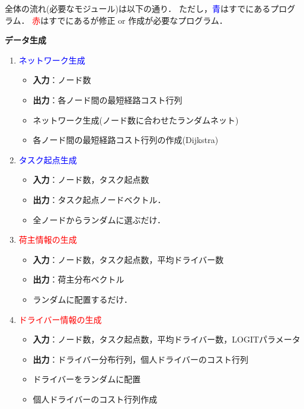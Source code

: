 \documentclass[a4paper,dvipdfmx]{ujarticle}
\begin{document}
    全体の流れ(必要なモジュール)は以下の通り．
    ただし，\textcolor{blue}{青}はすでにあるプログラム．
    \textcolor{red}{赤}はすでにあるが修正 or 作成が必要なプログラム．

    \textbf{データ生成}
    \begin{enumerate}
        \item \textcolor{blue}{ネットワーク生成}
            \begin{itemize}
                \item \textbf{入力}：ノード数
                \item \textbf{出力}：各ノード間の最短経路コスト行列
                \item ネットワーク生成(ノード数に合わせたランダムネット)
                \item 各ノード間の最短経路コスト行列の作成(Dijkstra)
            \end{itemize}

        \item \textcolor{blue}{タスク起点生成}
            \begin{itemize}
                \item \textbf{入力}：ノード数，タスク起点数
                \item \textbf{出力}：タスク起点ノードベクトル．
                \item 全ノードからランダムに選ぶだけ．
            \end{itemize}

        \item \textcolor{red}{荷主情報の生成}
            \begin{itemize}
                \item \textbf{入力}：ノード数，タスク起点数，平均ドライバー数
                \item \textbf{出力}：荷主分布ベクトル
                \item ランダムに配置するだけ．
            \end{itemize}


        \item \textcolor{red}{ドライバー情報の生成}
            \begin{itemize}
                \item \textbf{入力}：ノード数，タスク起点数，平均ドライバー数，LOGITパラメータ
                \item \textbf{出力}：ドライバー分布行列，個人ドライバーのコスト行列
                \item ドライバーをランダムに配置
                \item 個人ドライバーのコスト行列作成
            \end{itemize}
    \end{enumerate}
\end{document}
